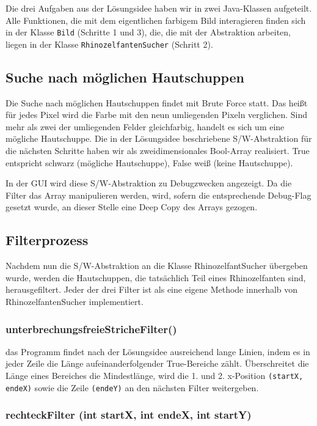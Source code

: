 Die drei Aufgaben aus der Lösungsidee haben wir in zwei Java-Klassen aufgeteilt. Alle Funktionen, die mit dem eigentlichen farbigem Bild interagieren finden sich in der Klasse \texttt{Bild} (Schritte 1 und 3), die, die mit der Abstraktion arbeiten, liegen in der Klasse \texttt{RhinozelfantenSucher} (Schritt 2).

	\subsection {Suche nach möglichen Hautschuppen}

	Die Suche nach möglichen Hautschuppen findet mit Brute Force statt. Das heißt für jedes Pixel wird die Farbe mit den neun umliegenden Pixeln verglichen. Sind mehr als zwei der umliegenden Felder gleichfarbig, handelt es sich um eine mögliche Hautschuppe. Die in der Lösungsidee beschriebene S/W-Abstraktion für die nächsten Schritte haben wir als zweidimensionales Bool-Array realisiert. True entspricht schwarz (mögliche Hautschuppe), False weiß (keine Hautschuppe). 

	In der GUI wird diese S/W-Abstraktion zu Debugzwecken angezeigt. Da die Filter das Array manipulieren werden, wird, sofern die entsprechende Debug-Flag gesetzt wurde, an dieser Stelle eine Deep Copy des Arrays gezogen.

	\subsection {Filterprozess}
	Nachdem nun die S/W-Abstraktion an die Klasse RhinozelfantSucher übergeben wurde, werden die Hautschuppen, die tatsächlich Teil eines Rhinozelfanten sind, herausgefiltert. Jeder der drei Filter ist als eine eigene Methode innerhalb von RhinozelfantenSucher implementiert.

		\subsubsection{unterbrechungsfreieStricheFilter()}

		das Programm findet nach der Lösungsidee ausreichend lange Linien, indem es in jeder Zeile die Länge aufeinanderfolgender True-Bereiche zählt. Überschreitet die Länge eines Bereiches die Mindestlänge, wird die 1. und 2. x-Position \texttt{(startX, endeX)} sowie die Zeile \texttt{(endeY)} an den nächsten Filter weitergeben.

		\subsubsection{rechteckFilter (int startX, int endeX, int startY)}

